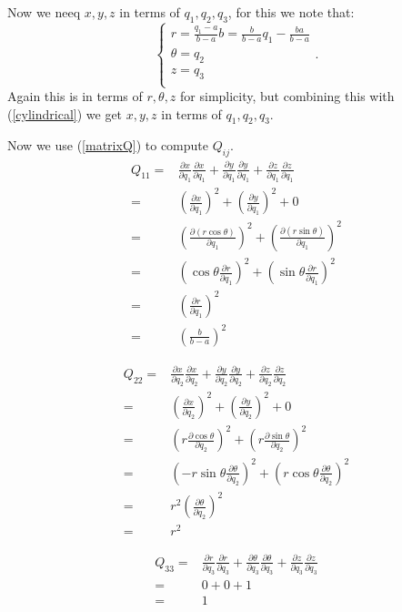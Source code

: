 \documentclass{amsart}
\begin{document}
Now we neeq $x,y,z$ in terms of $q_1,q_2,q_3$, for this we note that:
\[\begin{cases}
r=\frac{q_1-a}{b-a}b=\frac{b}{b-a}q_1-\frac{ba}{b-a}\\
\theta=q_2\\
z=q_3\\
\end{cases}.\]
Again this is in terms of $r,\theta,z$ for simplicity, but combining this with (\ref{cylindrical})
we get $x,y,z$ in terms of $q_1,q_2,q_3$.

Now we use (\ref{matrixQ}) to compute $Q_{ij}$.
\begin{align*}
Q_{11}
=&\frac{\partial x}{\partial q_1}\frac{\partial x}{\partial q_1}
+\frac{\partial y}{\partial q_1}\frac{\partial y}{\partial q_1}
+\frac{\partial z}{\partial q_1}\frac{\partial z}{\partial q_1}\\
=&\left(\frac{\partial x}{\partial q_1}\right)^2+\left(\frac{\partial y}{\partial q_1}\right)^2+0\\
=&\left(\frac{\partial (r\cos\theta)}{\partial q_1}\right)^2+\left(\frac{\partial (r\sin\theta)}{\partial q_1}\right)^2\\
=&\left(\cos\theta\frac{\partial r}{\partial q_1}\right)^2+\left(\sin\theta\frac{\partial r}{\partial q_1}\right)^2\\
=&\left(\frac{\partial r}{\partial q_1}\right)^2\\
=&\left(\frac{b}{b-a}\right)^2
\end{align*}

\begin{align*}
Q_{22}
=&\frac{\partial x}{\partial q_2}\frac{\partial x}{\partial q_2}
+\frac{\partial y}{\partial q_2}\frac{\partial y}{\partial q_2}
+\frac{\partial z}{\partial q_2}\frac{\partial z}{\partial q_2}\\
=&\left(\frac{\partial x}{\partial q_2}\right)^2+\left(\frac{\partial y}{\partial q_2}\right)^2+0\\
=&\left(r\frac{\partial \cos\theta}{\partial q_2}\right)^2+\left(r\frac{\partial \sin\theta}{\partial q_2}\right)^2\\
=&\left(-r\sin\theta\frac{\partial \theta}{\partial q_2}\right)^2+\left(r\cos\theta\frac{\partial \theta}{\partial q_2}\right)^2\\
=&r^2\left(\frac{\partial \theta}{\partial q_2}\right)^2\\
=&r^2
\end{align*}

\begin{align*}
Q_{33}
=&\frac{\partial r}{\partial q_3}\frac{\partial r}{\partial q_3}
+\frac{\partial \theta}{\partial q_3}\frac{\partial \theta}{\partial q_3}
+\frac{\partial z}{\partial q_3}\frac{\partial z}{\partial q_3}\\
=&0+0+1\\
=&1
\end{align*}
\end{document}
